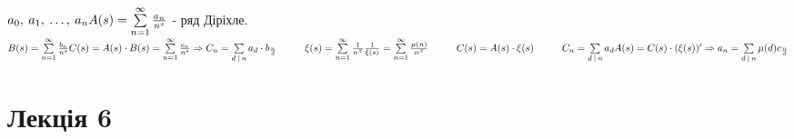 \documentclass[a4paper,12pt]{bookest}
\newcommand\tab[1][1cm]{\hspace*{#1}}
\begin{document}
\begin{example}
	$a_0,\>a_1,\>\dots,\>a_n\\ A(s)=\sum\limits_{n=1}^{\infty}\frac{a_n}{n^s}$ - ряд Діріхле.\tab $B(s)=\sum\limits_{n=1}^{\infty}\frac{b_n}{n^s}\\C(s)=A(s)\cdot B(s)=\sum\limits_{n=1}^{\infty}\frac{c_n}{n^s}\Rightarrow C_n=\sum\limits_{d\>|\>n}a_d\cdot b_{\frac nd}\tab\xi(s)=\sum\limits_{n=1}^{\infty}\frac1{n^S}\\ \frac1{\xi(s)}=\sum\limits_{n=1}^{\infty}\frac{\mu(n)}{n^S}\tab C(s)=A(s)\cdot\xi(s)\tab C_n=\sum\limits_{d\>|\>n	}a_d\\ A(s)=C(s)\cdot(\xi(s))'\Rightarrow a_n=\sum\limits_{d\>|\>n}\mu(d)c_{\frac nd}$
\end{example}
\let\cleardoublepage\clearpage
\chapter{Лекція 6}
\end{document}
